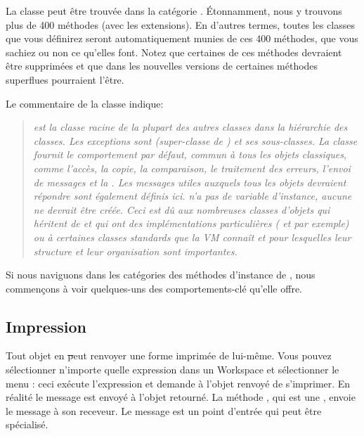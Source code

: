 \documentclass[a4paper,10pt,twoside]{book}
\begin{document}
La classe  peut être trouvée dans la catégorie
. Étonnamment, nous y trouvons plus de 400
méthodes (avec les extensions). En d'autres termes, toutes les
classes que vous définirez seront automatiquement munies de ces 400
méthodes, que vous sachiez ou non ce qu'elles font.
Notez que certaines de ces méthodes devraient être supprimées et
que dans les nouvelles versions de \pharo certaines méthodes superflues
pourraient l'être.

Le commentaire de la classe  indique:
\begin{quote}
\textit{ est la classe racine de la plupart des autres classes dans 
la hiérarchie des classes. Les exceptions sont  (super-classe de ) 
et ses sous-classes. La classe  fournit le comportement par défaut, commun à tous 
les objets classiques, comme l'accès, la copie, la comparaison, le traitement des erreurs, 
l'envoi de messages et la . Les messages utiles auxquels tous les objets 
devraient répondre sont également définis ici.
 n'a pas de variable d'instance, aucune ne devrait être
créée. Ceci est dû aux nombreuses classes d'objets qui
héritent de  et qui ont des implémentations
particulières ( et  par
exemple) ou à certaines classes standards que la VM connaît et
pour lesquelles leur structure et leur organisation sont importantes.}
\end{quote}

Si nous naviguons dans les catégories des méthodes d'instance de , nous commençons 
à voir quelques-uns des comportements-clé qu'elle offre.

\subsection{Impression}
Tout objet en \st peut renvoyer une forme imprimée de lui-même. Vous pouvez sélectionner 
n'importe quelle expression dans un Workspace et sélectionner le menu : 
ceci exécute l'expression et demande à l'objet renvoyé de s'imprimer. En réalité le 
message  est envoyé à l'objet retourné. La méthode , 
qui est une , envoie le message  à son receveur. 
Le message  est un point d'entrée qui peut être spécialisé. 
\end{document}
